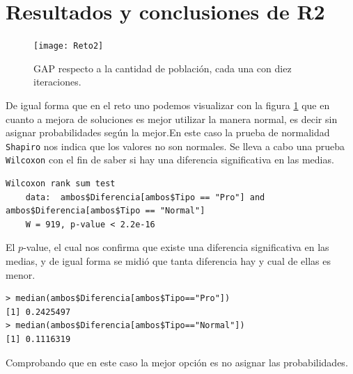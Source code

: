 \documentclass[a4paper]{article}
\begin{document}
\section{Resultados y conclusiones de R2}
\begin{figure}[h!]
\centering
\texttt{[image: Reto2]}
\caption{GAP respecto a la cantidad de población, cada una con diez iteraciones.}
\label{fig:Reto2}
\end{figure}

De igual forma que en el reto uno podemos visualizar con la figura \ref{fig:Reto2} que en cuanto a mejora de soluciones es mejor utilizar la manera normal, es decir sin asignar probabilidades según la mejor.En este caso la prueba de normalidad \texttt{Shapiro} nos indica que los valores no son normales. Se lleva a cabo una prueba \texttt{Wilcoxon} con el fin de saber si hay una diferencia significativa en las medias.
\begin{lstlisting}[frame=single]
	Wilcoxon rank sum test
	data:  ambos$Diferencia[ambos$Tipo == "Pro"] and ambos$Diferencia[ambos$Tipo == "Normal"]
	W = 919, p-value < 2.2e-16
\end{lstlisting}
El  $p$-value, el cual nos confirma que existe una diferencia significativa en las medias, y de igual forma se midió que tanta diferencia hay y cual de ellas es menor.

\begin{lstlisting}[frame=single]
> median(ambos$Diferencia[ambos$Tipo=="Pro"])
[1] 0.2425497
> median(ambos$Diferencia[ambos$Tipo=="Normal"])
[1] 0.1116319
\end{lstlisting}
Comprobando que en este caso la mejor opción es no asignar las probabilidades.
\end{document}
